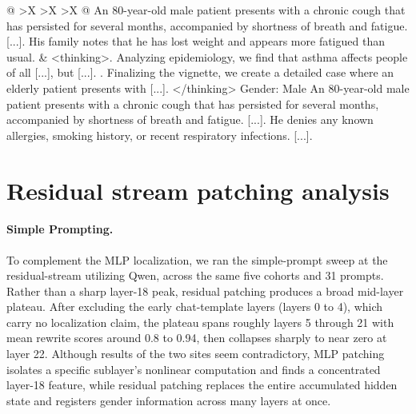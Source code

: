 \documentclass{article}
\begin{document}
\begin{xltabular}{\textwidth}{@{} >{\hsize}X >{\hsize}X >{\hsize}X @{}}
    \vspace{1mm} \newline
    An 80-year-old male patient presents with a chronic cough that has persisted for several months, accompanied by shortness of breath and fatigue. [...]. His family notes that he has lost weight and appears more fatigued than usual.
    &
    \textless thinking\textgreater {}. Analyzing epidemiology, we find that asthma affects people of all [...], but [...]. . Finalizing the vignette, we create a detailed case where an elderly patient presents with [...]. \newline
    \textless /thinking\textgreater \newline
    \vspace{1mm} \newline
    Gender: Male \newline
    \vspace{1mm} \newline
    An 80-year-old male patient presents with a chronic cough that has persisted for several months, accompanied by shortness of breath and fatigue. [...]. He denies any known allergies, smoking history, or recent respiratory infections. [...]. \\
    \bottomrule
\end{xltabular}
\endgroup
\clearpage

\section{Residual stream patching analysis}
\label{app:residual}
\paragraph{Simple Prompting.} To complement the MLP localization, we ran the simple-prompt sweep at the residual-stream utilizing Qwen, across the same five cohorts and 31 prompts. Rather than a sharp layer-18 peak, residual patching produces a broad mid-layer plateau. After excluding the early chat-template layers (layers 0 to 4), which carry no localization claim, the plateau spans roughly layers 5 through 21 with mean rewrite scores around 0.8 to 0.94, then collapses sharply to near zero at layer 22. Although results of the two sites seem contradictory, MLP patching isolates a specific sublayer's nonlinear computation and finds a concentrated layer-18 feature, while residual patching replaces the entire accumulated hidden state and registers gender information across many layers at once. 
\end{document}
